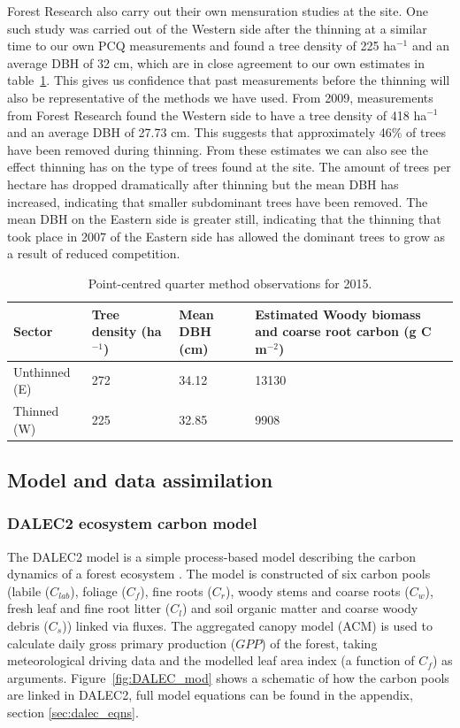 \documentclass[12pt]{article}
\begin{document}
Forest Research also carry out their own mensuration studies at the site. One such study was carried out of the Western side after the thinning at a similar time to our own PCQ measurements and found a tree density of 225 ha\(^{-1}\) and an average DBH of 32 cm, which are in close agreement to our own estimates in table~\ref{table:cwoo_obs}. This gives us confidence that past measurements before the thinning will also be representative of the methods we have used. From 2009, measurements from Forest Research found the Western side to have a tree density of 418 ha\(^{-1}\) and an average DBH of 27.73 cm. This suggests that approximately 46\% of trees have been removed during thinning. From these estimates we can also see the effect thinning has on the type of trees found at the site. The amount of trees per hectare has dropped dramatically after thinning but the mean DBH has increased, indicating that smaller subdominant trees have been removed. The mean DBH on the Eastern side is greater still, indicating that the thinning that took place in 2007 of the Eastern side has allowed the dominant trees to grow as a result of reduced competition.

\begin{table}[ht] 
	\caption{Point-centred quarter method observations for 2015.}
\begin{center}
	\begin{tabular}{| l | p{2cm} | p{2cm} | p{4.5cm} |}
	\hline
	Sector & Tree density (ha\(^{-1}\)) & Mean DBH (cm) & Estimated Woody biomass and coarse root carbon (g C m\(^{-2}\)) \\ \hline
	Unthinned (E) & 272 & 34.12 & 13130 \\ \hline
	Thinned (W) & 225 & 32.85 & 9908 \\ \hline
	\end{tabular}
	\label{table:cwoo_obs}
\end{center} 
\end{table}

\subsection{Model and data assimilation}
\subsubsection{DALEC2 ecosystem carbon model} \label{sec:dalec2}

The DALEC2 model is a simple process-based model describing the carbon dynamics of a forest ecosystem \citep{Bloom2015}. The model is constructed of six carbon pools (labile ($C_{lab}$), foliage ($C_f$), fine roots ($C_r$), woody stems and coarse roots ($C_w$), fresh leaf and fine root litter ($C_l$) and soil organic matter and coarse woody debris ($C_s$)) linked via fluxes. The aggregated canopy model (ACM) \citep{williams1997predicting} is used to calculate daily gross primary production ($GPP$) of the forest, taking meteorological driving data and the modelled leaf area index (a function of $C_f$) as arguments. Figure~\ref{fig:DALEC_mod} shows a schematic of how the carbon pools are linked in DALEC2, full model equations can be found in the appendix, section \ref{sec:dalec_eqns}.   
\end{document}
